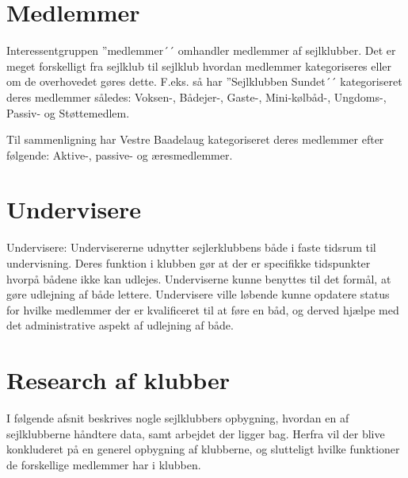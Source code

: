 \section{Medlemmer}

Interessentgruppen ''medlemmer´´ omhandler medlemmer af sejlklubber. Det er meget forskelligt fra sejlklub til
sejlklub hvordan medlemmer kategoriseres eller om de overhovedet gøres dette. F.eks. så har ''Sejlklubben
Sundet´´ kategoriseret deres medlemmer således: Voksen-, Bådejer-, Gaste-, Mini-kølbåd-, Ungdoms-, Passiv- og
Støttemedlem.

Til sammenligning har Vestre Baadelaug kategoriseret deres medlemmer efter følgende: Aktive-, passive- og
æresmedlemmer.




\section{Undervisere}

Undervisere: Undervisererne udnytter sejlerklubbens både i faste tidsrum til undervisning. Deres funktion i
klubben gør at der er specifikke tidspunkter hvorpå bådene ikke kan udlejes. Underviserne kunne benyttes til
det formål, at gøre udlejning af både lettere. Undervisere ville løbende kunne opdatere status for hvilke
medlemmer der er kvalificeret til at føre en båd, og derved hjælpe med det administrative aspekt af udlejning
af både.

\cbstart
\section{Research af klubber}\label{sec:research}

I følgende afsnit beskrives nogle sejlklubbers opbygning, hvordan en af sejlklubberne håndtere data, samt arbejdet der ligger bag. Herfra vil der blive konkluderet på en generel opbygning af klubberne, og slutteligt hvilke funktioner de forskellige medlemmer har i klubben.

